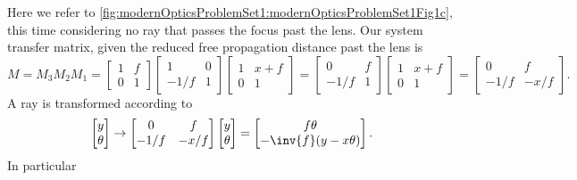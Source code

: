 {\begin{enumerate}
Here we refer to \cref{fig:modernOpticsProblemSet1:modernOpticsProblemSet1Fig1c}, this time considering no ray that passes the focus past the lens.  Our system transfer matrix, given the reduced free propagation distance past the lens is
%
\begin{dmath}\label{eqn:modernOpticsProblemSet1P1:1610}
M
= M_3 M_2 M_1
=
\begin{bmatrix}
1 & f \\
0 & 1
\end{bmatrix}
\begin{bmatrix}
1 & 0 \\
-1/f & 1
\end{bmatrix}
\begin{bmatrix}
1 & x + f \\
0 & 1
\end{bmatrix}
=
\begin{bmatrix}
0 & f \\
-1/f & 1
\end{bmatrix}
\begin{bmatrix}
1 & x + f \\
0 & 1
\end{bmatrix}
=
\begin{bmatrix}
0 & f \\
-1/f & -x/f
\end{bmatrix}.
\end{dmath}
%
A ray is transformed according to
\begin{dmath}\label{eqn:modernOpticsProblemSet1P1:1630}
\begin{bmatrix}
y \\
\theta
\end{bmatrix}
\rightarrow
\begin{bmatrix}
0 & f \\
-1/f & -x/f
\end{bmatrix}
\begin{bmatrix}
y \\
\theta
\end{bmatrix}
=
\begin{bmatrix}
f \theta \\
-\inv{f} ( y - x \theta )
\end{bmatrix}.
\end{dmath}
%
In particular


\end{enumerate}}
